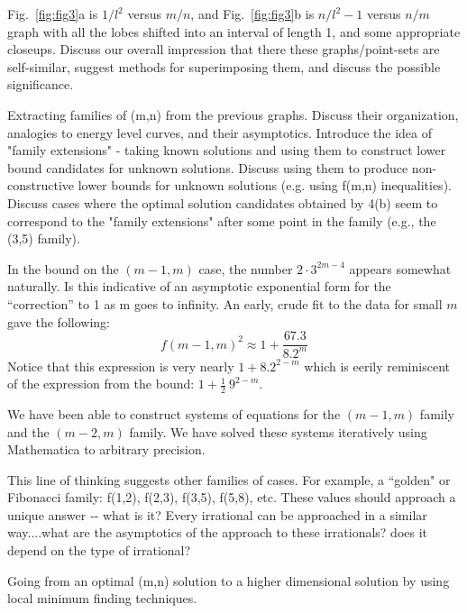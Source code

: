 \documentclass[superscriptaddress,reprint,amsmath,amssymb,aps]{revtex4-1}
\newcommand{\half}{\frac{1}{2}}
\begin{document}
Fig.~\ref{fig:fig3}a is $1/l^2$ versus $m/n$, and Fig.~\ref{fig:fig3}b is $n/l^2-1$ versus $n/m$
graph with all the lobes shifted into an interval of length 1, and some
appropriate closeups.  Discuss our overall impression that there these
graphs/point-sets are self-similar, suggest methods for superimposing them,
and discuss the possible significance.

Extracting families of (m,n) from the previous graphs.  Discuss their
organization, analogies to energy level curves, and their asymptotics.
Introduce the idea of "family extensions" - taking known solutions and
using them to construct lower bound candidates for unknown solutions.
Discuss using them to produce non-constructive lower bounds for unknown
solutions (e.g. using f(m,n) inequalities).  Discuss cases where the
optimal solution candidates obtained by 4(b) seem to correspond to the
"family extensions" after some point in the family (e.g., the (3,5)
family).

In the bound on the $(m-1,m)$ case, the number $2 \cdot 3^{2m-4}$ appears
somewhat naturally.  Is this indicative of an asymptotic exponential form
for the ``correction'' to 1 as m goes to infinity.  An early, crude fit to
the data for small $m$ gave the following:
\begin{equation*}
f(m-1,m)^2 \approx 1 + \frac{67.3}{8.2^m}
\end{equation*}
Notice that this expression is very nearly $1 + 8.2^{2-m}$ which
is eerily reminiscent of the expression from the bound: $1 + \half~9^{2-m}$.

\vspace{0.15in}
We have been able to construct systems of equations for the $(m-1,m)$ family
and the $(m-2,m)$ family.  We have solved these systems iteratively using
Mathematica to arbitrary precision.

\vspace{0.15in}
This line of thinking suggests other families of cases.  For example, a
``golden" or Fibonacci family:  f(1,2), f(2,3), f(3,5), f(5,8), etc.  These values should
approach a unique answer ‐‐ what is it?  Every irrational can be approached
in a similar way....what are the asymptotics of the approach to these
irrationals?  does it depend on the type of irrational?

\vspace{.15in}

Going from an optimal (m,n) solution to a higher dimensional solution by
using local minimum finding techniques.
\end{document}
